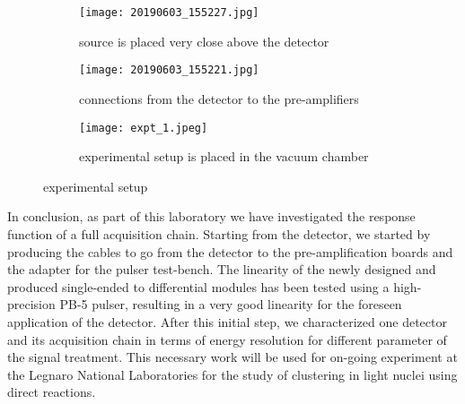 \documentclass[a4paper, 11pt]{article}
\begin{document}
\begin{figure}[h]
 
\begin{subfigure}{0.5\textwidth}
\texttt{[image: 20190603\_155227.jpg]} 
\caption{source is placed very close above the detector}
\label{fig:subim1}
\end{subfigure}
\begin{subfigure}{0.5\textwidth}
\texttt{[image: 20190603\_155221.jpg]}
\caption{connections from the detector to the pre-amplifiers}
\label{fig:subim2}
\end{subfigure}
\label{fig:image2}



\begin{subfigure}{0.5\textwidth}
\texttt{[image: expt\_1.jpeg]} 
\caption{experimental setup is placed in the vacuum chamber}
\label{fig:subim1}
\end{subfigure}

\caption{experimental setup}
\label{fig:image2}
\end{figure}

In conclusion, as part of this laboratory we have investigated the response function of a full acquisition chain. Starting from the detector, we started by producing the cables to go from the detector to the pre-amplification boards and the adapter for the pulser test-bench. The linearity of the newly designed and produced single-ended to differential modules has been tested using a high-precision PB-5 pulser, resulting in a very good linearity for the foreseen application of the detector. After this initial step, we characterized one detector and its acquisition chain in terms of energy resolution for different parameter of the signal treatment. This necessary work will be used for on-going experiment at the Legnaro National Laboratories for the study of clustering in light nuclei using direct reactions.  
 
      
      
\end{document}
